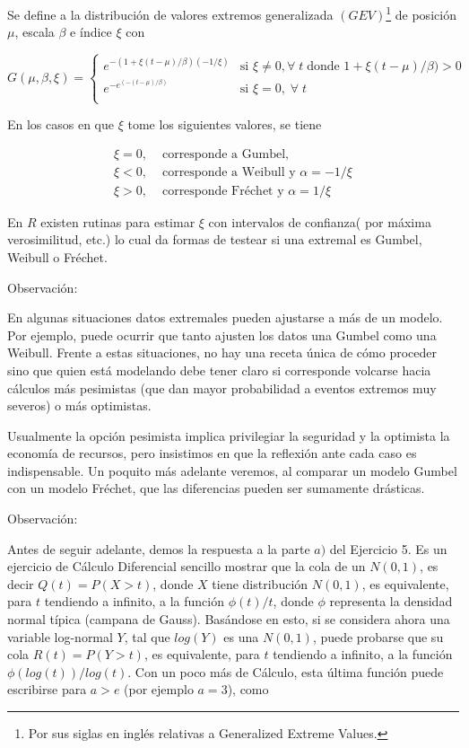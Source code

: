 \documentclass[
  oneside]{book}
\begin{document}
Se define a la distribución de valores extremos generalizada
\((GEV)\)\footnote{Por sus siglas en inglés relativas a Generalized Extreme Values.}
de posición \(\mu\), escala \(\beta\) e índice \(\xi\) con

\[
G(\mu,\beta,\xi) =
\begin{cases}
    e^{-(1+ \xi(t-\mu)/ \beta)(-1/ \xi)} & \text{si  } \xi \neq 0, \forall\;t\;\text{donde } 1+ \xi(t-\mu)/ \beta) >0 \\
    e^{-e^{(-(t-\mu)/ \beta)}} & \text{si  } \xi =0,\; \forall \;t \\
\end{cases}
\] \vspace{0.5cm}

En los casos en que \(\xi\) tome los siguientes valores, se tiene

\begin{align*}
 \xi=0,  & \text{ corresponde a Gumbel,} \\
 \xi< 0, &\text{ corresponde a Weibull y } \alpha=-1/ \xi \\
 \xi>0, &\text{ corresponde Fréchet y }  \alpha=1/ \xi
\end{align*}

En \(R\) existen rutinas para estimar \(\xi\) con intervalos de
confianza( por máxima verosimilitud, etc.) lo cual da formas de testear
si una extremal es Gumbel, Weibull o Fréchet.

Observación:

En algunas situaciones datos extremales pueden ajustarse a más de un
modelo. Por ejemplo, puede ocurrir que tanto ajusten los datos una
Gumbel como una Weibull. Frente a estas situaciones, no hay una receta
única de cómo proceder sino que quien está modelando debe tener claro si
corresponde volcarse hacia cálculos más pesimistas (que dan mayor
probabilidad a eventos extremos muy severos) o más optimistas.

Usualmente la opción pesimista implica privilegiar la seguridad y la
optimista la economía de recursos, pero insistimos en que la reflexión
ante cada caso es indispensable. Un poquito más adelante veremos, al
comparar un modelo Gumbel con un modelo Fréchet, que las diferencias
pueden ser sumamente drásticas.

Observación:

Antes de seguir adelante, demos la respuesta a la parte \(a)\) del
Ejercicio 5. Es un ejercicio de Cálculo Diferencial sencillo mostrar que
la cola de un \(N(0,1)\), es decir \(Q(t)=P(X>t)\), donde \(X\) tiene
distribución \(N(0,1)\), es equivalente, para \(t\) tendiendo a
infinito, a la función \(\phi(t)/t\), donde \(\phi\) representa la
densidad normal típica (campana de Gauss). Basándose en esto, si se
considera ahora una variable log-normal \(Y\), tal que \(log(Y)\) es una
\(N(0,1)\), puede probarse que su cola \(R(t)=P(Y>t)\), es equivalente,
para \(t\) tendiendo a infinito, a la función \(\phi(log(t))/log(t)\).
Con un poco más de Cálculo, esta última función puede escribirse para
\(a>e\) (por ejemplo \(a=3\)), como
\end{document}
